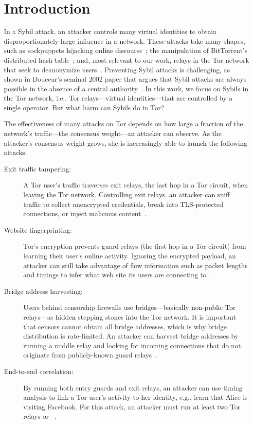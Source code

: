 \section{Introduction}
\label{sec:introduction}
In a Sybil attack, an attacker controls many virtual identities to obtain
disproportionately large influence in a network.  These attacks take many
shapes, such as sockpuppets hijacking online discourse~\cite{Thomas2012a}; the
manipulation of BitTorrent's distributed hash table~\cite{Wang2012a}; and, most
relevant to our work, relays in the Tor network that seek to deanonymize
users~\cite{cmucert}.  Preventing Sybil attacks is challenging, as shown in
Douceur's seminal 2002 paper that argues that Sybil attacks are always possible
in the absence of a central authority~\cite{Douceur2002a}.  In this work, we
focus on Sybils in the Tor network, i.e., Tor relays---virtual identities---that
are controlled by a single operator.  But what harm can Sybils do in Tor?

The effectiveness of many attacks on Tor depends on how large a fraction of the
network's traffic---the consensus weight---an attacker can observe.  As the
attacker's consensus weight grows, she is increasingly able to launch the
following attacks.

\begin{description}
	\item[Exit traffic tampering:] A Tor user's traffic traverses exit relays,
		the last hop in a Tor circuit, when leaving the Tor network.
		Controlling exit relays, an attacker can sniff traffic to collect
		unencrypted credentials, break into TLS-protected connections, or inject
		malicious content~\cite{Winter2014a}.
	\item[Website fingerprinting:] Tor's encryption prevents guard relays (the
		first hop in a Tor circuit) from learning their user's online activity.
		Ignoring the encrypted payload, an attacker can still take advantage of
		flow information such as packet lengths and timings to infer what web
		site its users are connecting to~\cite{Juarez2014a}.
	\item[Bridge address harvesting:] Users behind censorship firewalls use
		bridges---basically non-public Tor relays---as hidden stepping stones
		into the Tor network.  It is important that censors cannot obtain all
		bridge addresses, which is why bridge distribution is rate-limited.  An
		attacker can harvest bridge addresses by running a middle relay and
		looking for incoming connections that do not originate from
		publicly-known guard relays~\cite{Ling2012a}.
	\item[End-to-end correlation:] By running both entry guards and exit relays,
		an attacker can use timing analysis to link a Tor user's activity to her
		identity, e.g., learn that Alice is visiting Facebook.  For this attack,
		an attacker must run at least two Tor relays or ~\cite{Johnson2013a}.
\end{description}

